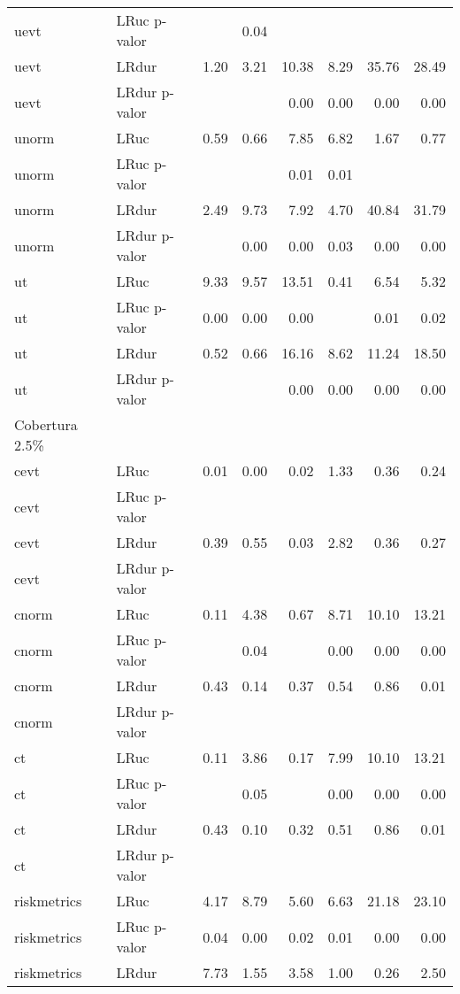 \begin{longtable}{llrrrrrr}
  uevt & LRuc p-valor &  & 0.04 &  &  &  &  \\ 
  uevt & LRdur & 1.20 & 3.21 & 10.38 & 8.29 & 35.76 & 28.49 \\ 
  uevt & LRdur p-valor &  &  & 0.00 & 0.00 & 0.00 & 0.00 \\ 
  unorm & LRuc & 0.59 & 0.66 & 7.85 & 6.82 & 1.67 & 0.77 \\ 
  unorm & LRuc p-valor &  &  & 0.01 & 0.01 &  &  \\ 
  unorm & LRdur & 2.49 & 9.73 & 7.92 & 4.70 & 40.84 & 31.79 \\ 
  unorm & LRdur p-valor &  & 0.00 & 0.00 & 0.03 & 0.00 & 0.00 \\ 
  ut & LRuc & 9.33 & 9.57 & 13.51 & 0.41 & 6.54 & 5.32 \\ 
  ut & LRuc p-valor & 0.00 & 0.00 & 0.00 &  & 0.01 & 0.02 \\ 
  ut & LRdur & 0.52 & 0.66 & 16.16 & 8.62 & 11.24 & 18.50 \\ 
  ut & LRdur p-valor &  &  & 0.00 & 0.00 & 0.00 & 0.00 \\ 
  Cobertura 2.5\% &  &  &  &  &  &  &  \\ 
  cevt & LRuc & 0.01 & 0.00 & 0.02 & 1.33 & 0.36 & 0.24 \\ 
  cevt & LRuc p-valor &  &  &  &  &  &  \\ 
  cevt & LRdur & 0.39 & 0.55 & 0.03 & 2.82 & 0.36 & 0.27 \\ 
  cevt & LRdur p-valor &  &  &  &  &  &  \\ 
  cnorm & LRuc & 0.11 & 4.38 & 0.67 & 8.71 & 10.10 & 13.21 \\ 
  cnorm & LRuc p-valor &  & 0.04 &  & 0.00 & 0.00 & 0.00 \\ 
  cnorm & LRdur & 0.43 & 0.14 & 0.37 & 0.54 & 0.86 & 0.01 \\ 
  cnorm & LRdur p-valor &  &  &  &  &  &  \\ 
  ct & LRuc & 0.11 & 3.86 & 0.17 & 7.99 & 10.10 & 13.21 \\ 
  ct & LRuc p-valor &  & 0.05 &  & 0.00 & 0.00 & 0.00 \\ 
  ct & LRdur & 0.43 & 0.10 & 0.32 & 0.51 & 0.86 & 0.01 \\ 
  ct & LRdur p-valor &  &  &  &  &  &  \\ 
  riskmetrics & LRuc & 4.17 & 8.79 & 5.60 & 6.63 & 21.18 & 23.10 \\ 
  riskmetrics & LRuc p-valor & 0.04 & 0.00 & 0.02 & 0.01 & 0.00 & 0.00 \\ 
  riskmetrics & LRdur & 7.73 & 1.55 & 3.58 & 1.00 & 0.26 & 2.50 \\ 

\end{longtable}
